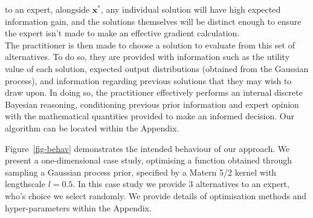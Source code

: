 \documentclass[
  letterpaper,
  DIV=11,
  numbers=noendperiod,
  oneside]{scrartcl}
\begin{document}
to an expert, alongside \(\mathbf{x}^*\), any individual solution will
have high expected information gain, and the solutions themselves will
be distinct enough to ensure the expert isn't made to make an effective
gradient calculation.\\
The practitioner is then made to choose a solution to evaluate from this
set of alternatives. To do so, they are provided with information such
as the utility value of each solution, expected output distributions
(obtained from the Gaussian process), and information regarding previous
solutions that they may wish to draw upon. In doing so, the practitioner
effectively performs an internal discrete Bayesian reasoning,
conditioning previous prior information and expert opinion with the
mathematical quantities provided to make an informed decision. Our
algorithm can be located within the Appendix.

Figure~\ref{fig-behav} demonstrates the intended behaviour of our
approach. We present a one-dimensional case study, optimising a function
obtained through sampling a Gaussian process prior, specified by a
Matern 5/2 kernel with lengthscale \(l=0.5\). In this case study we
provide 3 alternatives to an expert, who's choice we select randomly. We
provide details of optimisation methods and hyper-parameters within the
Appendix.
\end{document}
